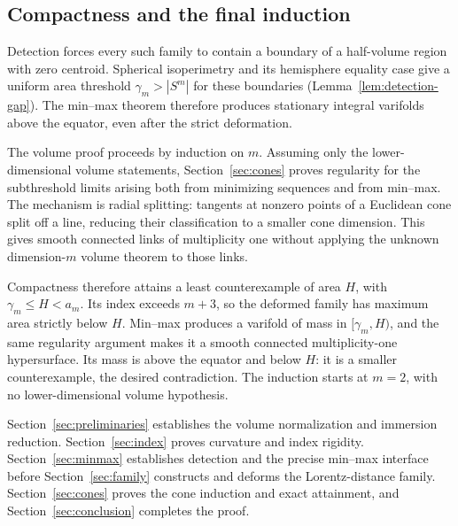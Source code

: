 \subsection*{Compactness and the final induction}

Detection forces every such family to contain a boundary of a
half-volume region with zero centroid. Spherical isoperimetry and its
hemisphere equality case give a uniform area threshold
\(\gamma_m>|S^m|\) for these boundaries
(Lemma~\ref{lem:detection-gap}). The min--max theorem therefore produces
stationary integral varifolds above the equator, even after the
strict deformation.

The volume proof proceeds by induction on \(m\). Assuming only the
lower-dimensional volume statements, Section~\ref{sec:cones} proves
regularity for the subthreshold limits arising both from minimizing
sequences and from min--max. The mechanism is radial splitting:
tangents at nonzero points of a Euclidean cone split off a line,
reducing their classification to a smaller cone dimension. This gives
smooth connected links of multiplicity one without applying the
unknown dimension-\(m\) volume theorem to those links.

Compactness therefore attains a least counterexample of area \(H\),
with \(\gamma_m\le H<a_m\). Its index exceeds \(m+3\), so the deformed
family has maximum area strictly below \(H\). Min--max produces a
varifold of mass in \([\gamma_m,H)\), and the same regularity argument
makes it a smooth connected multiplicity-one hypersurface. Its mass
is above the equator and below \(H\): it is a smaller counterexample,
the desired contradiction. The induction starts at \(m=2\), with
no lower-dimensional volume hypothesis.

Section~\ref{sec:preliminaries} establishes the volume normalization and
immersion reduction. Section~\ref{sec:index} proves curvature and index
rigidity. Section~\ref{sec:minmax} establishes detection and the precise
min--max interface before Section~\ref{sec:family} constructs and deforms
the Lorentz-distance family. Section~\ref{sec:cones} proves the cone
induction and exact attainment, and Section~\ref{sec:conclusion}
completes the proof.
